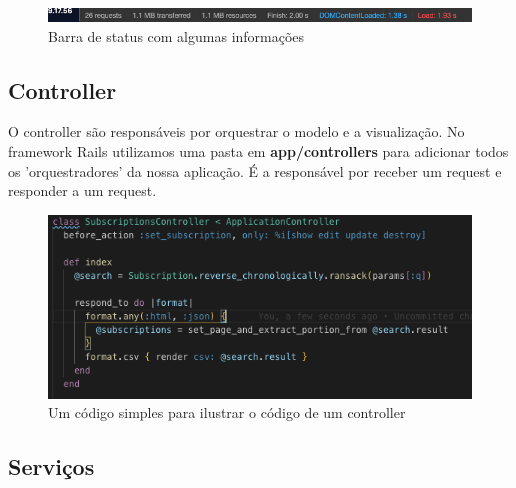 \begin{figure}[htbp]
\hypertarget{arquitetura}{%
\caption{ Barra de status com algumas informações }
\begin{center}
\includegraphics[width=15cm]{Monografia-FormatoLatex/Imagens/status-request-file-size.png}
\end{center}
}
\label{fig:devtools-status-barra}
\end{figure}



\subsection{Controller}

O controller são responsáveis por orquestrar o modelo e a visualização. No framework Rails utilizamos uma pasta em \textbf{app/controllers} para adicionar todos os 'orquestradores' da nossa aplicação. É a responsável por receber um request e responder a um request.



\begin{figure}[htbp]
\hypertarget{arquitetura}{%
\caption{ Um código simples para ilustrar o código de um controller }
\begin{center}
\includegraphics[width=15cm]{Monografia-FormatoLatex/Imagens/controller-camadas-exemplo.png}
\end{center}
}
\label{fig:controller-camadas}
\end{figure}


\subsection{Serviços}

